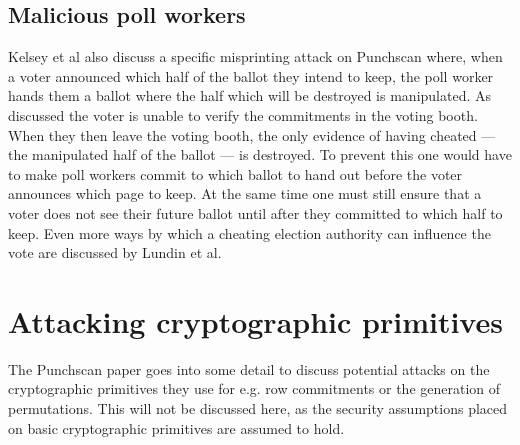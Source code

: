 \subsection{Malicious poll workers}

Kelsey et al also discuss a specific misprinting attack on
Punchscan\autocite[chapter 3]{kelseyAttackingPaperBasedE2E2010} where, when a
voter announced which half of the ballot they intend to keep, the poll worker
hands them a ballot where the half which will be destroyed is manipulated. As
discussed the voter is unable to verify the commitments in the voting booth.
When they then leave the voting booth, the only evidence of having cheated ---
the manipulated half of the ballot --- is destroyed. To prevent this one would
have to make poll workers commit to which ballot to hand out before the voter
announces which page to keep. At the same time one must still ensure that a
voter does not see their future ballot until after they committed to which half
to keep. Even more ways by which a cheating election authority can influence
the vote are discussed by Lundin et al\autocite{lundinTearDestroyChain2012}.

\section{Attacking cryptographic primitives}

The Punchscan paper goes into some detail to discuss potential attacks on the
cryptographic primitives they use for e.g. row commitments or the generation of
permutations. This will not be discussed here, as the security assumptions
placed on basic cryptographic primitives are assumed to hold.
